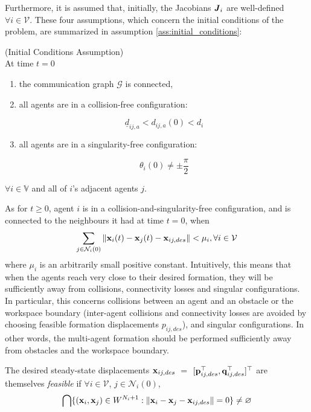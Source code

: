Furthermore, it is assumed that, initially, the Jacobians $\bm{\mathit{J}}_i$ are
well-defined $\forall i \in \mathcal{V}$. These four assumptions, which concern
the initial conditions of the problem, are summarized in assumption
\ref{ass:initial_conditions}:

\begin{gg_box}
\begin{assumption}(Initial Conditions Assumption)\\

  At time $t = 0$

  \begin{enumerate}

	  \item the communication graph $\mathcal{G}$ is connected,

    \item all agents are in a collision-free configuration:

      $$\underline{d}_{ij,a} < d_{ij,a}(0) < d_i$$

    \item all agents are in a singularity-free configuration:

      $$\theta_i(0) \neq \pm \frac{\pi}{2}$$

  \end{enumerate}
  $\forall i \in \mathbb{V}$ and all of $i$'s adjacent agents $j$.
  \label{ass:initial_conditions}
\end{assumption}
\end{gg_box}


As for $t \geq 0$, agent $i$ is in a collision-and-singularity-free
configuration, and is connected to the neighbours it had at time $t = 0$,
when
$$\sum_{j \in \mathcal{N}_i(0)} \| \bm{\mathbf{x}}_i(t) - \bm{\mathbf{x}}_j(t) - \bm{\mathbf{x}}_{ij,des}\| < \mu_i,
\forall i \in \mathcal{V}$$
where $\mu_i$ is an arbitrarily small positive constant. Intuitively, this
means that when the agents reach very close to their desired formation, they
will be sufficiently away from collisions, connectivity losses and singular
configurations. In particular, this concerns collisions between an agent and
an obstacle or the workspace boundary (inter-agent collisions and connectivity
losses are avoided by choosing feasible formation displacements $p_{ij,des}$),
and singular configurations. In other words, the multi-agent formation should be
performed sufficiently away from obstacles and the workspace boundary.

The desired steady-state displacements
$\bm{\mathbf{x}}_{ij,des}$ $=$ $[\bm{\mathbf{p}}_{ij,des}^{\top}, \bm{\mathbf{q}}_{ij,des}^{\top}]^{\top}$
are themselves \textit{feasible} if $\forall i \in \mathcal{V}$,
$j \in \mathcal{N}_i(0)$,
$$\bigcap \{(\bm{\mathbf{x}}_i, \bm{\mathbf{x}}_j) \in W^{N_i + 1} : \| \bm{\mathbf{x}}_i - \bm{\mathbf{x}}_j - \bm{\mathbf{x}}_{ij,des} \| = 0 \}
\ne \varnothing$$



